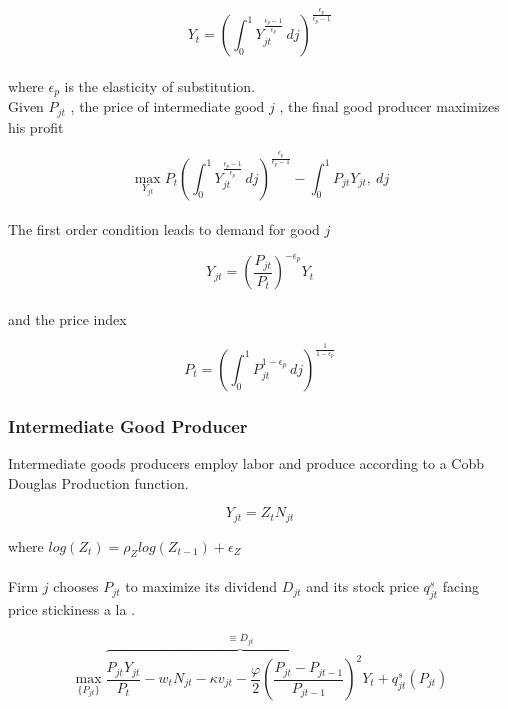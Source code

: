 \documentclass[titlepage]{\econtex}\providecommand{\texname}{Dissertation-Proposal}
\begin{document}
$$ Y_{t} = \left(\int_{0}^{1} Y_{jt}^{\frac{\epsilon_{p}-1}{\epsilon_{p}}}\, dj\right)^{\frac{\epsilon_{p}}{\epsilon_{p}-1}}$$ \\

where $\epsilon_{p}$ is the elasticity of substitution. \\ 

Given $P_{jt}$ , the price of intermediate good $j$ ,  the final good producer maximizes his profit

$$ \max_{Y_{jt}} P_{t} \left(\int_{0}^{1} Y_{jt}^{\frac{\epsilon_{p}-1}{\epsilon_{p}}}\, dj\right)^{\frac{\epsilon_{p}}{\epsilon_{p}-1}} - \int_{0}^{1} P_{jt} Y_{jt} ,\ dj $$ \\


The first order condition leads to demand for good $j$

\begin{equation} Y_{jt} = \left(\frac {P_{jt}}{P_{t}}\right)^{- \epsilon_{p}} Y_{t}\end{equation} \\

and the price index

\begin{equation} P_{t} = \left(\int_{0}^{1} P_{jt}^{1-\epsilon_{p}}\,dj \right )^{\frac{1}{1-\epsilon_{p}}} \end{equation}


\hypertarget{Intermediate Good Producer}{}
\subsubsection{Intermediate Good Producer}

Intermediate goods producers employ labor and produce according to a Cobb Douglas Production function. 

$$Y_{jt} =  Z_{t}  N_{jt}$$ 

where $log(Z_{t}) = \rho_{Z} log( Z_{t-1}) + \epsilon_{Z}$ \\ \\

  
 
 Firm $j$ chooses $P_{jt}$ to maximize its dividend $D_{jt}$ and its stock price $q^{s}_{jt} $ facing price stickiness a la \cite{rotemberg1982sticky}.
 
  
  $$\max_{\{P_{jt}\}} \overbrace{\frac{P_{jt}Y_{jt}}{P_{t}} - w_{t} N_{jt} - \kappa v_{jt} -  \frac{\varphi}{2}\left( \frac{P_{jt} - P_{jt-1}}{P_{jt-1}} \right)^{2} Y_{t} }^{ \equiv D_{jt}} + q^{s}_{jt}\left(P_{jt}\right) $$
\end{document}
